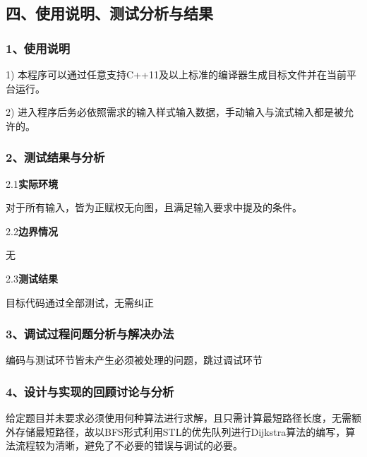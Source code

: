 \documentclass[UTF8, a4paper]{ctexart}
\begin{document}
\subsection*{四、使用说明、测试分析与结果}
\subsubsection*{1、使用说明}
1) 本程序可以通过任意支持C++11及以上标准的编译器生成目标文件并在当前平台运行。 \par
2) 进入程序后务必依照需求的输入样式输入数据，手动输入与流式输入都是被允许的。 \par
\subsubsection*{2、测试结果与分析}
2.1\;\textbf{实际环境} \par
对于所有输入，皆为正赋权无向图，且满足输入要求中提及的条件。 \par
2.2\;\textbf{边界情况} \par
无 \par
2.3\;\textbf{测试结果} \par
目标代码通过全部测试，无需纠正 \par
\subsubsection*{3、调试过程问题分析与解决办法}
编码与测试环节皆未产生必须被处理的问题，跳过调试环节 \par
\subsubsection*{4、设计与实现的回顾讨论与分析}
给定题目并未要求必须使用何种算法进行求解，且只需计算最短路径长度，无需额外存储最短路径，故以BFS形式利用STL的优先队列进行Dijkstra算法的编写，算法流程较为清晰，避免了不必要的错误与调试的必要。 \par
\end{document}
